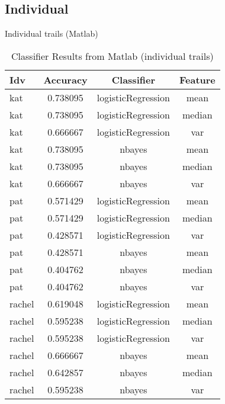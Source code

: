 \subsection{Individual} 
\begin{frame}{Individual trails (Matlab)} 
   \begin{table}
    \begin{tabular}{l|ccc}
    Idv	    &Accuracy	    &Classifier		    &Feature \\ \hline \hline
    \rowcolor{blue} kat     &0.738095       &logisticRegression     &mean   \\
    \rowcolor{teal} kat     &0.738095       &logisticRegression     &median \\
    kat     &0.666667       &logisticRegression     &var    \\
    \rowcolor{teal}kat     &0.738095       &nbayes &mean                   \\
    kat     &0.738095       &nbayes &median                 \\
    kat     &0.666667       &nbayes &var                    \\ \hline
    \rowcolor{blue}pat     &0.571429       &logisticRegression     &mean   \\
    \rowcolor{teal} pat     &0.571429       &logisticRegression     &median \\
    pat     &0.428571       &logisticRegression     &var    \\
    pat     &0.428571       &nbayes &mean                   \\
    pat     &0.404762       &nbayes &median                 \\
    pat     &0.404762       &nbayes &var                    \\ \hline
    rachel  &0.619048       &logisticRegression     &mean   \\
    rachel  &0.595238       &logisticRegression     &median \\
    rachel  &0.595238       &logisticRegression     &var    \\
    \rowcolor{blue}rachel  &0.666667       &nbayes &mean                   \\
    rachel  &0.642857       &nbayes &median                 \\
    rachel  &0.595238       &nbayes &var                    \\

    \end{tabular}
    \caption{Classifier Results from Matlab (individual trails)}
   \end{table}
\end{frame}

